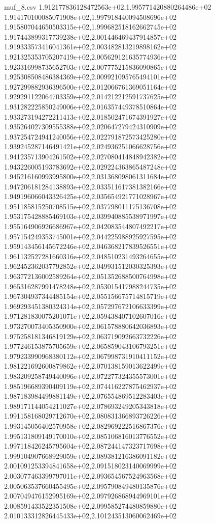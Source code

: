 \begin{filecontents*}{muf_8.csv}
1.912177836128472563e+02,1.995771420880264486e+02
1.914170100085071908e+02,1.997918440094508696e+02
1.915807044650503315e+02,1.999682518162662745e+02
1.917443899317739238e+02,2.001446469437914857e+02
1.919333573416041361e+02,2.003482813219898162e+02
1.921325353705207419e+02,2.005629121635774936e+02
1.923316998735652703e+02,2.007775215836090865e+02
1.925308508486384369e+02,2.009921095765494101e+02
1.927299882936396500e+02,2.012066761369051164e+02
1.929291122064703359e+02,2.014212212591737625e+02
1.931282225850249006e+02,2.016357449378510864e+02
1.933273194272211413e+02,2.018502471674391927e+02
1.935264027309555388e+02,2.020647279424310909e+02
1.937254724941240056e+02,2.022791872573425280e+02
1.939245287146491421e+02,2.024936251066628756e+02
1.941235713904261502e+02,2.027080414848942382e+02
1.943226005193783692e+02,2.029224363865487248e+02
1.945216160993995800e+02,2.031368098061311684e+02
1.947206181284138893e+02,2.033511617381382166e+02
1.949196066043326425e+02,2.035654921771028967e+02
1.951185815250708515e+02,2.037798011175136708e+02
1.953175428885469103e+02,2.039940885538971997e+02
1.955164906926686967e+02,2.042083544807492217e+02
1.957154249353745001e+02,2.044225988925927595e+02
1.959143456145672246e+02,2.046368217839526551e+02
1.961132527281660316e+02,2.048510231493264655e+02
1.962452362037792852e+02,2.049931512030325393e+02
1.963772136002589264e+02,2.051352688500764998e+02
1.965316287991478248e+02,2.053015417988244735e+02
1.967304937344485154e+02,2.055156675714815719e+02
1.969293451380324314e+02,2.057297672106633399e+02
1.971281830075201071e+02,2.059438407102607016e+02
1.973270073405350900e+02,2.061578880642036893e+02
1.975258181346819129e+02,2.063719092663732226e+02
1.977246153875705659e+02,2.065859043106793251e+02
1.979233990968380112e+02,2.067998731910411152e+02
1.981221692600879862e+02,2.070138159013622499e+02
1.983209258749440096e+02,2.072277324355573001e+02
1.985196689390409119e+02,2.074416227875462937e+02
1.987183984499881149e+02,2.076554869512283403e+02
1.989171144054211027e+02,2.078693249205343818e+02
1.991158168029712670e+02,2.080831366893726226e+02
1.993145056402570958e+02,2.082969222516867376e+02
1.995131809149170010e+02,2.085106816013776552e+02
1.997118426245795604e+02,2.087244147323717698e+02
1.999104907668929059e+02,2.089381216386091182e+02
2.001091253394841658e+02,2.091518023140069999e+02
2.003077463399797011e+02,2.093654567524963568e+02
2.005063537660455495e+02,2.095790849480135876e+02
2.007049476152995169e+02,2.097926868944969101e+02
2.008591433522351508e+02,2.099585274480859880e+02
2.010133312826445433e+02,2.101243513060062469e+02

\end{filecontents*}
